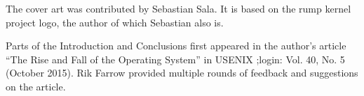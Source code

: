 \documentclass[openright]{tkkdiss}
\begin{document}
\begin{preface}
The cover art was contributed by Sebastian Sala.  It is based on the
rump kernel project logo, the author of which Sebastian also is.

%

Parts of the Introduction and Conclusions first appeared in the author's
article ``The Rise and Fall of the Operating System'' in USENIX ;login:
Vol. 40, No. 5 (October 2015).  Rik Farrow provided multiple rounds of
feedback and suggestions on the article.


\clearpage


\end{preface}


\tableofcontents


\begin{listofabbreviations}

\printnomenclature[5cm]

\end{listofabbreviations}


\listoffigures
\listoftables









\end{document}
